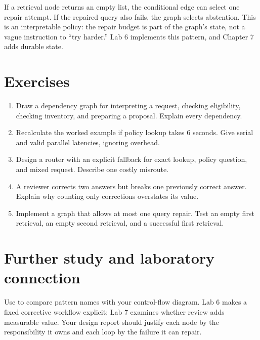 If a retrieval node returns an empty list, the conditional edge can select one repair attempt. If the repaired query also fails, the graph selects abstention. This is an interpretable policy: the repair budget is part of the graph's state, not a vague instruction to “try harder.” Lab 6 implements this pattern, and Chapter 7 adds durable state.

\section{Exercises}
\begin{enumerate}
\item Draw a dependency graph for interpreting a request, checking eligibility, checking inventory, and preparing a proposal. Explain every dependency.
\item Recalculate the worked example if policy lookup takes 6 seconds. Give serial and valid parallel latencies, ignoring overhead.
\item Design a router with an explicit fallback for exact lookup, policy question, and mixed request. Describe one costly misroute.
\item A reviewer corrects two answers but breaks one previously correct answer. Explain why counting only corrections overstates its value.
\item Implement a graph that allows at most one query repair. Test an empty first retrieval, an empty second retrieval, and a successful first retrieval.
\end{enumerate}

\section{Further study and laboratory connection}
Use \cite{effective-agents} to compare pattern names with your control-flow diagram. Lab 6 makes a fixed corrective workflow explicit; Lab 7 examines whether review adds measurable value. Your design report should justify each node by the responsibility it owns and each loop by the failure it can repair.

